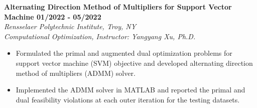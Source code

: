 \documentclass[letterpaper, 11pt]{article}
\newcommand{\subsectionvspace}{\vspace{8pt}}
\begin{document}
    \subsectionvspace

    \textbf{Alternating Direction Method of Multipliers for Support Vector Machine \hfill 01/2022 - 05/2022} \\
    \textit{Rensselaer Polytechnic Institute, Troy, NY} \\
    \textit{Computational Optimization, Instructor: Yangyang Xu, Ph.D.}
    \begin{itemize}
        \item Formulated the primal and augmented dual optimization problems for support vector machine (SVM) objective and developed alternating direction method of multipliers (ADMM) solver.
        \item Implemented the ADMM solver in MATLAB and reported the primal and dual feasibility violations at each outer iteration for the testing datasets.
    \end{itemize}




\end{document}
